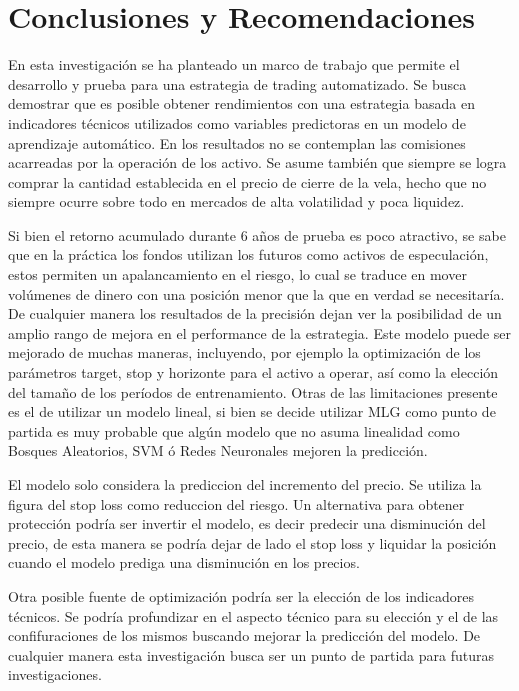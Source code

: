 \documentclass[a4paper,12pt]{Latex/Classes/PhDthesisPSnPDF}
\begin{document}
\chapter*{Conclusiones y Recomendaciones}

En esta investigación se ha planteado un marco de trabajo que permite el desarrollo y prueba para una estrategia de trading automatizado. Se busca demostrar que es posible obtener rendimientos con una estrategia basada en indicadores técnicos utilizados como variables predictoras en un modelo de aprendizaje automático. En los resultados no se contemplan las comisiones acarreadas por la operación de los activo. Se asume también que siempre se logra comprar la cantidad establecida en el precio de cierre de la vela, hecho que no siempre ocurre sobre todo en mercados de alta volatilidad y poca liquidez.

Si bien el retorno acumulado durante 6 años de prueba es poco atractivo, se sabe que en la práctica los fondos utilizan los futuros como activos de especulación, estos permiten un apalancamiento en el riesgo, lo cual se traduce en mover volúmenes de dinero con una posición menor que la que en verdad se necesitaría. De cualquier manera los resultados de la precisión dejan ver la posibilidad de un amplio rango de mejora en el performance de la estrategia. Este modelo puede ser mejorado de muchas maneras, incluyendo, por ejemplo la optimización de los parámetros target, stop y horizonte para el activo a operar, así como la elección del tamaño de los períodos de entrenamiento. Otras de las limitaciones presente es el de utilizar un modelo lineal, si bien se decide utilizar MLG como punto de partida es muy probable que algún modelo que no asuma linealidad como Bosques Aleatorios, SVM ó Redes Neuronales mejoren la predicción. 

El modelo solo considera la prediccion del incremento del precio. Se utiliza la figura del stop loss como reduccion del riesgo. Un alternativa para obtener protección podría ser invertir el modelo, es decir predecir una disminución del precio, de esta manera se podría dejar de lado el stop loss y liquidar la posición cuando el modelo prediga una disminución en los precios.

Otra posible fuente de optimización podría ser la elección de los indicadores técnicos. Se podría profundizar en el aspecto técnico para su elección y el de las confifuraciones de los mismos buscando mejorar la predicción del modelo. De cualquier manera esta investigación busca ser un punto de partida para futuras investigaciones.
\end{document}
